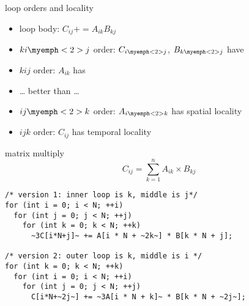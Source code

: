 \begin{frame}{loop orders and locality}
\begin{itemize}
\item loop body: $C_{ij} += A_{ik}B_{kj}$
\item $ki\myemph<2>{j}$ order: $C_{i\myemph<2>{j}}$, $B_{k\myemph<2>{j}}$ have 
\item $kij$ order: $A_{ik}$ has 
\item \ldots{} better than \ldots{}
\item $ij\myemph<2>{k}$ order: $A_{i\myemph<2>{k}}$ has spatial locality
\item $ijk$ order: $C_{ij}$ has temporal locality
\end{itemize}
\end{frame}

\begin{frame}[fragile,label=matrixMultTwoVersionsHilite]{matrix multiply}
\[ C_{ij} = \sum_{k=1}^n A_{ik}\times B_{kj} \]
\begin{lstlisting}
/* version 1: inner loop is k, middle is j*/
for (int i = 0; i < N; ++i)
  for (int j = 0; j < N; ++j)
    for (int k = 0; k < N; ++k)
      ~3C[i*N+j]~ += A[i * N + ~2k~] * B[k * N + j];

/* version 2: outer loop is k, middle is i */
for (int k = 0; k < N; ++k)
  for (int i = 0; i < N; ++i)
    for (int j = 0; j < N; ++j)
      C[i*N+~2j~] += ~3A[i * N + k]~ * B[k * N + ~2j~];
\end{lstlisting}
\end{frame}
